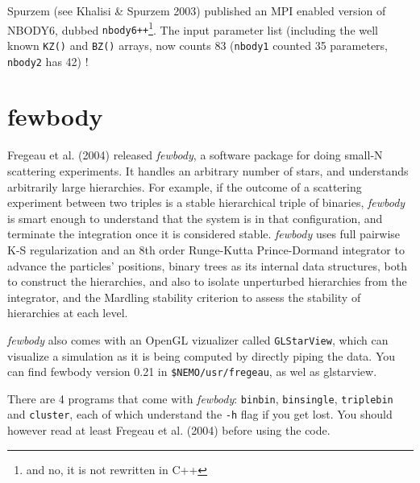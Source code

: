 Spurzem (see Khalisi \& Spurzem 2003) published an MPI enabled version
of NBODY6, dubbed {\tt nbody6++}\footnote{and no, it is not rewritten in C++}.
The input parameter list (including the well known {\tt KZ()} and {\tt BZ()}
arrays, now counts 83  ({\tt nbody1} counted 35 parameters, {\tt nbody2} has 42) !

\section{fewbody}

Fregeau et al. (2004) released 
{\it fewbody}, a software package for doing
small-N scattering experiments. It handles an arbitrary number of stars,
and understands arbitrarily large hierarchies. For example, if the
outcome of a scattering experiment between two triples is a stable
hierarchical triple of binaries, {\it fewbody} is smart enough to
understand that the system is in that configuration, and terminate the
integration once it is considered stable. {\it fewbody} uses full pairwise
K-S regularization and an 8th order Runge-Kutta Prince-Dormand
integrator to advance the particles' positions, binary trees as its
internal data structures, both to construct the hierarchies, and also
to isolate unperturbed hierarchies from the integrator, and the
Mardling stability criterion to assess the stability of hierarchies at
each level.

{\it fewbody} also comes with an OpenGL vizualizer called {\tt GLStarView},
which can visualize a simulation as it is being computed by directly
piping the data. You can find fewbody  version 0.21 in {\tt \$NEMO/usr/fregeau},
as wel as glstarview.

There are  4 programs that come with {\it fewbody}:
{\tt binbin}, {\tt binsingle}, {\tt triplebin} and {\tt cluster},
 each of which understand the
{\tt -h} flag if you get lost. You should however read at least
Fregeau et al. (2004) before using the code.

